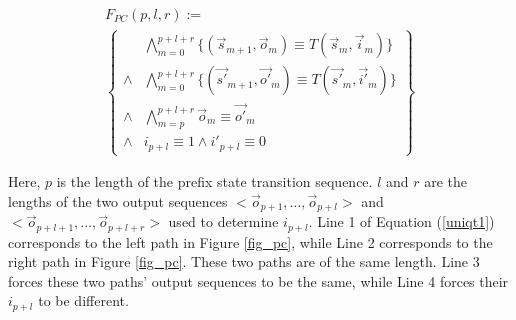 \documentclass[twocolumn]{article}
\begin{document}
\begin{multline}\label{uniqt1}
F_{PC}(p,l,r):=\\
\left\{
\begin{array}{cc}
&\bigwedge_{m=0}^{p+l+r}
\{
(\vec{s}_{m+1},\vec{o}_m)\equiv T(\vec{s}_m,\vec{i}_m)
\}
\\
\wedge&\bigwedge_{m=0}^{p+l+r}
\{
(\vec{s'}_{m+1},\vec{o'}_m)\equiv T(\vec{s'}_m,\vec{i'}_m)
\}
\\
\wedge&\bigwedge_{m=p}^{p+l+r}\vec{o}_m\equiv \vec{o'}_m \\
\wedge& i_{p+l}\equiv 1 \wedge  i'_{p+l}\equiv 0 
\end{array}
\right\}
\end{multline}



Here,
$p$ is the length of the prefix state transition sequence.
$l$ and $r$ are the lengths of the two output sequences 
$<\vec{o}_{p+1},\dots,\vec{o}_{p+l}>$ and $<\vec{o}_{p+l+1},\dots,\vec{o}_{p+l+r}>$
used to determine $i_{p+l}$.
Line 1 of Equation (\ref{uniqt1}) corresponds to the left path in Figure \ref{fig_pc},
while Line 2 corresponds to the right path in Figure \ref{fig_pc}.
These two paths are of the same length.
Line 3 forces these two paths' output sequences to be the same,
while Line 4 forces their $i_{p+l}$ to be different.


\end{document}
